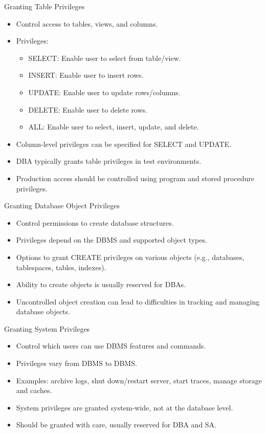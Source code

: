 \documentclass{beamer}
\begin{document}
\begin{frame}{Granting Table Privileges}
  \begin{itemize}
    \item Control access to tables, views, and columns.
    \item Privileges:
      \begin{itemize}
        \item SELECT: Enable user to select from table/view.
        \item INSERT: Enable user to insert rows.
        \item UPDATE: Enable user to update rows/columns.
        \item DELETE: Enable user to delete rows.
        \item ALL: Enable user to select, insert, update, and delete.
      \end{itemize}
    \item Column-level privileges can be specified for SELECT and UPDATE.
\item DBA typically grants table privileges in test environments.
\item Production access should be controlled using program and stored procedure privileges.
\end{itemize}
\end{frame}

\begin{frame}{Granting Database Object Privileges}
    \begin{itemize}
        \item Control permissions to create database structures.
        \item Privileges depend on the DBMS and supported object types.
        \item Options to grant CREATE privileges on various objects (e.g., databases, tablespaces, tables, indexes).
        \item Ability to create objects is usually reserved for DBAs.
        \item Uncontrolled object creation can lead to difficulties in tracking and managing database objects.
    \end{itemize}
\end{frame}

\begin{frame}{Granting System Privileges}
    \begin{itemize}
        \item Control which users can use DBMS features and commands.
        \item Privileges vary from DBMS to DBMS.
        \item Examples: archive logs, shut down/restart server, start traces, manage storage and caches.
        \item System privileges are granted system-wide, not at the database level.
        \item Should be granted with care, usually reserved for DBA and SA.
    \end{itemize}
\end{frame}
\end{document}
